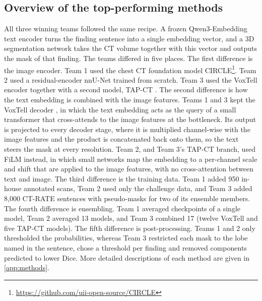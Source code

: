 \documentclass[final,5p,times,twocolumn,authoryear,numafflabel]{elsarticle}
\begin{document}
\subsection{Overview of the top-performing methods}
\label{sec:top-methods}
All three winning teams followed the same recipe. A frozen Qwen3-Embedding
text encoder \citep{zhang2025qwen3} turns the finding sentence into a single
embedding vector, and a 3D segmentation network takes the CT volume together
with this vector and outputs the mask of that finding. The teams differed in
five places. The first difference is the image encoder. Team 1 used the chest
CT foundation model CIRCLE\footnote{\url{https://github.com/uii-open-source/CIRCLE}}.
Team 2 used a residual-encoder nnU-Net trained from scratch. Team 3 used the
VoxTell encoder together with a second model, TAP-CT \citep{veenboer2025tap}.
The second difference is how the text embedding is combined with the image
features. Teams 1 and 3 kept the VoxTell decoder \citep{rokuss2026voxtell}, in
which the text embedding acts as the query of a small transformer that
cross-attends to the image features at the bottleneck. Its output is projected
to every decoder stage, where it is multiplied channel-wise with the image
features and the product is concatenated back onto them, so the text steers
the mask at every resolution. Team 2, and Team 3's TAP-CT branch, used FiLM
\citep{perez2018film} instead, in which small networks map the embedding to a
per-channel scale and shift that are applied to the image features, with no
cross-attention between text and image. The
third difference is the training data. Team 1 added 950 in-house annotated
scans, Team 2 used only the challenge data, and Team 3 added 8,000 CT-RATE
sentences with pseudo-masks for two of its ensemble members. The fourth
difference is ensembling. Team 1 averaged checkpoints of a single model, Team 2
averaged 13 models, and Team 3 combined 17 (twelve VoxTell and five TAP-CT
models). The fifth difference is post-processing. Teams 1 and 2 only
thresholded the probabilities, whereas Team 3 restricted each mask to the lobe
named in the sentence, chose a threshold per finding and removed components
predicted to lower Dice. More detailed descriptions of each method are given in \ref{app:methods}.
\end{document}
